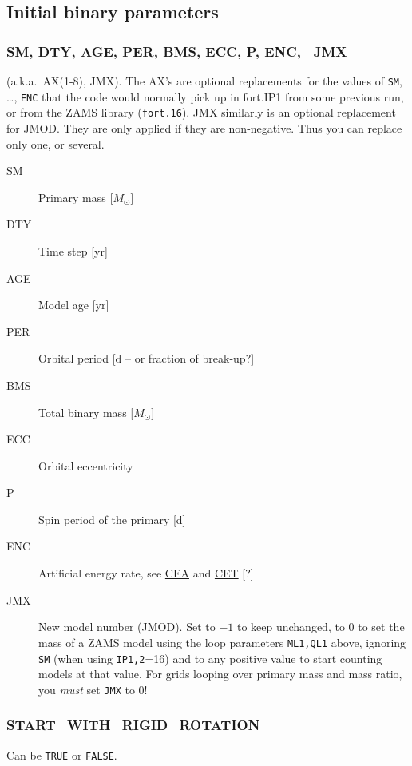 \subsection{Initial binary parameters}
\subsubsection*{SM, DTY, AGE, PER, BMS, ECC, P, ENC,  ~JMX}
(a.k.a.\ AX(1-8), JMX).
The AX's are optional replacements for the values of \texttt{SM}, \ldots, \texttt{ENC} that the 
code would normally pick up in fort.IP1 from some previous run, or from the ZAMS
library (\texttt{fort.16}). JMX similarly is an optional replacement
for JMOD. They are only applied if they are non-negative. Thus you can replace
only one, or several.

\begin{description}
\item[SM]\hypertarget{sm}{} Primary mass [$M_\odot$]
\item[DTY]\hypertarget{dty}{} Time step [yr]
\item[AGE]\hypertarget{age}{} Model age [yr]
\item[PER]\hypertarget{per}{} Orbital period [d -- or fraction of break-up?]
\item[BMS]\hypertarget{bms}{} Total binary mass [$M_\odot$]
\item[ECC]\hypertarget{ecc}{} Orbital eccentricity
\item[P]\hypertarget{p}{} Spin period of the primary [d]
\item[ENC]\hypertarget{enc}{}\hypertarget{enc}{} Artificial energy rate, see \hyperlink{cea}{CEA} and \hyperlink{cet}{CET} [?]
\item[JMX]\hypertarget{jmx}{} New model number (JMOD). Set to $-1$ to keep unchanged, to $0$ to set the mass of a ZAMS model 
  using the loop parameters \texttt{ML1,QL1} above, ignoring \texttt{SM}  (when using \texttt{IP1,2}=16) 
   and to any positive value to start counting models at that value.
  For grids looping over primary mass and mass ratio, you \emph{must} set \texttt{JMX} to $0$!
\end{description}


\subsubsection*{START\_WITH\_RIGID\_ROTATION}
Can be \texttt{TRUE} or \texttt{FALSE}.




